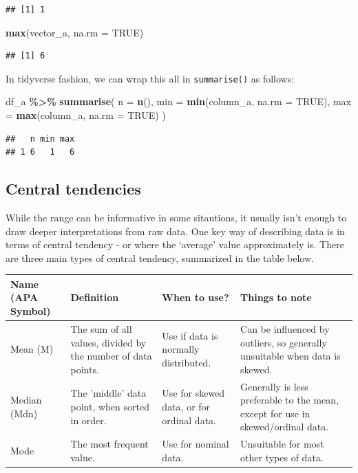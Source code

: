 \documentclass[
]{book}
\newenvironment{Shaded}{\begin{snugshade}}{\end{snugshade}}
\newcommand{\AttributeTok}[1]{\textcolor[rgb]{0.13,0.29,0.53}{#1}}
\newcommand{\ConstantTok}[1]{\textcolor[rgb]{0.56,0.35,0.01}{#1}}
\newcommand{\FunctionTok}[1]{\textcolor[rgb]{0.13,0.29,0.53}{\textbf{#1}}}
\newcommand{\NormalTok}[1]{#1}
\newcommand{\SpecialCharTok}[1]{\textcolor[rgb]{0.81,0.36,0.00}{\textbf{#1}}}
\begin{document}
\begin{verbatim}
## [1] 1
\end{verbatim}

\begin{Shaded}
\begin{Highlighting}[]
\FunctionTok{max}\NormalTok{(vector\_a, }\AttributeTok{na.rm =} \ConstantTok{TRUE}\NormalTok{)}
\end{Highlighting}
\end{Shaded}

\begin{verbatim}
## [1] 6
\end{verbatim}

In tidyverse fashion, we can wrap this all in \texttt{summarise()} as follows:

\begin{Shaded}
\begin{Highlighting}[]
\NormalTok{df\_a }\SpecialCharTok{\%\textgreater{}\%}
  \FunctionTok{summarise}\NormalTok{(}
    \AttributeTok{n =} \FunctionTok{n}\NormalTok{(),}
    \AttributeTok{min =} \FunctionTok{min}\NormalTok{(column\_a, }\AttributeTok{na.rm =} \ConstantTok{TRUE}\NormalTok{),}
    \AttributeTok{max =} \FunctionTok{max}\NormalTok{(column\_a, }\AttributeTok{na.rm =} \ConstantTok{TRUE}\NormalTok{)}
\NormalTok{  )}
\end{Highlighting}
\end{Shaded}

\begin{verbatim}
##   n min max
## 1 6   1   6
\end{verbatim}

\subsection{Central tendencies}\label{central-tendency}

While the range can be informative in some sitautions, it usually isn't enough to draw deeper interpretations from raw data. One key way of describing data is in terms of central tendency - or where the `average' value approximately is. There are three main types of central tendency, summarized in the table below.

\begin{tabular}{l|l|l|l}
\hline
Name (APA Symbol) & Definition & When to use? & Things to note\\
\hline
Mean (M) & The sum of all values, divided by the number of data points. & Use if data is normally distributed. & Can be influenced by outliers, so generally unsuitable when data is skewed.\\
\hline
Median (Mdn) & The 'middle' data point, when sorted in order. & Use for skewed data, or for ordinal data. & Generally is less preferable to the mean, except for use in skewed/ordinal data.\\
\hline
Mode & The most frequent value. & Use for nominal data. & Unsuitable for most other types of data.\\
\hline
\end{tabular}
\end{document}
